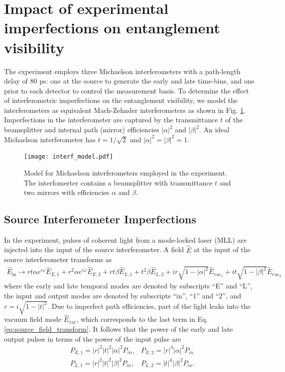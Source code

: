 \documentclass[11pt]{caltech_thesis} %
\begin{document}
\hypertarget{impact-of-experimental-imperfections-on-entanglement-visibility}{%
\section{Impact of experimental imperfections on entanglement visibility}\label{impact-of-experimental-imperfections-on-entanglement-visibility}}

The experiment employs three Michaelson interferometers with a path-length delay of 80 ps: one at the source to generate the early and late time-bins, and one prior to each detector to control the measurement basis. To determine the effect of interferometric imperfections on the entanglement visibility, we model the interferometers as equivalent Mach-Zehnder interferometers as shown in Fig. \ref{fig:interf_model}. Imperfections in the interferometer are captured by the transmittance $t$ of the beamsplitter and internal path (mirror) efficiencies $|\alpha|^2$ and $|\beta|^2$. An ideal Michaelson interferometer has $t = 1/\sqrt{2}$ and $|\alpha|^2 = |\beta|^2 = 1$.

\begin{figure}[h!]
    \centering
    \texttt{[image: interf\_model.pdf]}
    \caption{Model for Michaelson interferometers employed in the experiment. The interfomerter contains a beamsplitter with transmittance $t$ and two mirrors with efficiencies $\alpha$ and $\beta$.}
    \label{fig:interf_model}
\end{figure}

\subsection{Source Interferometer Imperfections}

In the experiment, pulses of coherent light from a mode-locked laser (MLL) are injected into the input of the source interferometer. A field $\hat{E}$ at the input of the source interferometer transforms as
\begin{align}
    \hat{E}_{\text{in}}  \rightarrow rt \alpha e^{i\varphi} \hat{E}_{E,1} +  r^2 \alpha e^{i\varphi}\hat{E}_{E,2} + rt\beta \hat{E}_{L,1} + t^2\beta \hat{E}_{L,2} + ir\sqrt{1-|\alpha|^2}\hat{E}_{\text{vac}_1} +it\sqrt{1-|\beta|^2}\hat{E}_{\text{vac}_2} \label{eq:source_field_transform}
\end{align}
where the early and late temporal modes are denoted by subscripts ``E'' and ``L'', the input and output modes are denoted by subscripts ``in'', ``1'' and ``2'', and $r = i\sqrt{1-|t|^2}$. Due to imperfect path efficiencies, part of the light leaks into the vacuum field mode $\hat{E}_{\text{vac}}$, which corresponds to the last term in Eq. \ref{eq:source_field_transform}. It follows that the power of the early and late output pulses in terms of the power of the input pulse are
\begin{align}
    &P_{E,1} = |r|^2|t|^2|\alpha|^2 P_{in},&P_{E,2} = |r|^4 |\alpha|^2 P_{in} \label{eq:powers}\\
    &P_{L,1} = |r|^2|t|^2|\beta|^2 P_{in} ,&P_{L,2} = |t|^4 |\beta|^2 P_{in}.\nonumber 
\end{align}
\end{document}
